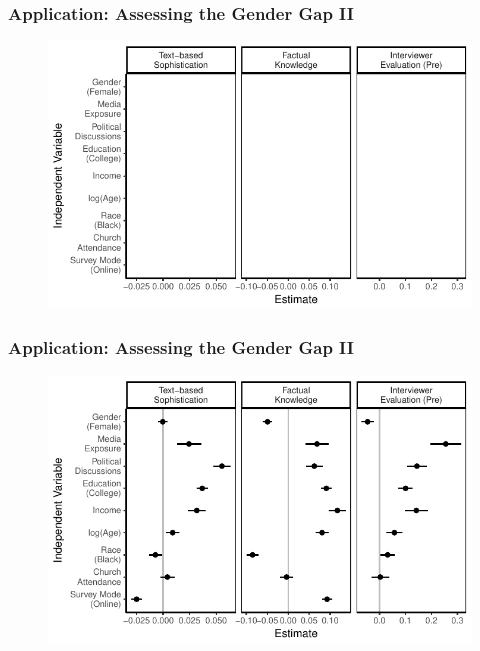 \documentclass{beamer}
\begin{document}
\begin{frame} %
\frametitle{Application: Assessing the Gender Gap II}
  \begin{figure}
  \includegraphics{../fig/determinants_empty.pdf}
  \end{figure}
\end{frame}
\begin{frame} %
\frametitle{Application: Assessing the Gender Gap II}
  \begin{figure}
  \includegraphics{../fig/determinants_pres.pdf}
  \end{figure}
\end{frame}

\end{document}

